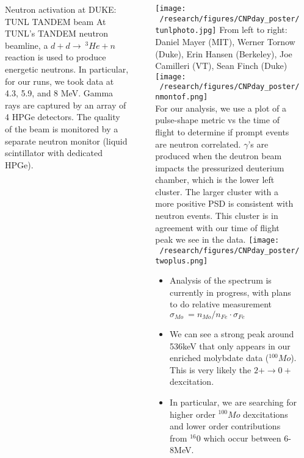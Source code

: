 \documentclass[final]{beamer}
\newlength{\sepwidth}
\newlength{\colwidth}
\newcommand{\separatorcolumn}{\begin{column}{\sepwidth}\end{column}}
\begin{document}
\begin{frame}[t]
\begin{columns}[t]
\begin{column}{\colwidth}
\begin{block}{Neutron activation at DUKE: TUNL TANDEM beam}
  At TUNL's TANDEM neutron beamline, a $d+d\rightarrow \ ^{3}He + n$ reaction is used to produce energetic neutrons. In particular, for our runs, we took data at 4.3, 5.9, and 8 MeV. Gamma rays are captured by an array of 4 HPGe detectors. The quality of the beam is monitored by a separate neutron monitor (liquid scintillator with dedicated HPGe).



 
  \end{block}

  

  

\end{column}

\separatorcolumn

\begin{column}{\colwidth}
      \vspace{5cm}
      
      \texttt{[image: ~/research/figures/CNPday\_poster/tunlphoto.jpg]}
      {\footnotesize From left to right: Daniel Mayer (MIT), Werner Tornow (Duke), Erin Hansen (Berkeley), Joe Camilleri (VT), Sean Finch (Duke)}
      \texttt{[image: ~/research/figures/CNPday\_poster/nmontof.png]}
     \\
      For our analysis, we use a plot of a pulse-shape metric vs the time of flight to determine if prompt events are neutron correlated. $\gamma$'s are produced when the deutron beam impacts the pressurized deuterium chamber, which is the lower left cluster. The larger cluster with a more positive PSD is consistent with neutron events. This cluster is in agreement with our time of flight peak we see in the data.
      \texttt{[image: ~/research/figures/CNPday\_poster/twoplus.png]}
      \begin{itemize}
      \item Analysis of the spectrum is currently in progress, with plans to do relative measurement $\sigma_{Mo} \ =  n_{Mo} / n_{Fe} \cdot\sigma_{Fe}$
      \item We can see a strong peak around 536keV that only appears in our enriched molybdate data ($^{100} Mo$). This is very likely the \textbf{$2+\rightarrow 0+$} dexcitation.
      \item In particular, we are searching for higher order $^{100}Mo$ dexcitations and lower order contributions from $^{16}0$ which occur between 6-8MeV.
      \end{itemize}

  




\end{column}

\separatorcolumn
\end{columns}
\end{frame}
\end{document}
